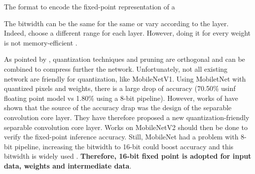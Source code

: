 The format to encode the fixed-point representation of a

The bitwidth can be the same for the same or vary according to the layer. Indeed, \textcite{qiu_going_2016, yin_high_2018} choose a different range for each layer. However, doing it for every weight is not memory-efficient \cite{qiu_going_2016, yin_high_2018}.

As pointed by \textcite{han_deep_2016}, quantization techniques and pruning are orthogonal and can be combined to compress further the network. Unfortunately, not all existing network are friendly for quantization, like MobileNetV1. Using MobiletNet with quantized pixels and weights, there is a large drop of accuracy (70.50\% usinf floating point model vs 1.80\% using a 8-bit pipeline). However, works of \textcite{sheng_quantization-friendly_2018} have shown that the source of the accuracy drap was the design of the separable convolution core layer. They have therefore proposed a new quantization-friendly separable convolution core layer. Works on MobileNetV2 should then be done to verify the fixed-point inference accuracy. Still, MobileNet had a problem with 8-bit pipeline, increasing the bitwidth to 16-bit could boost accuracy \cite{cheng_recent_2018} and this bitwidth is widely used \cite{huimin_li_high_2016, bai_cnn_2018}. \textbf{Therefore, 16-bit fixed point is adopted for input data, weights and intermediate data}.
